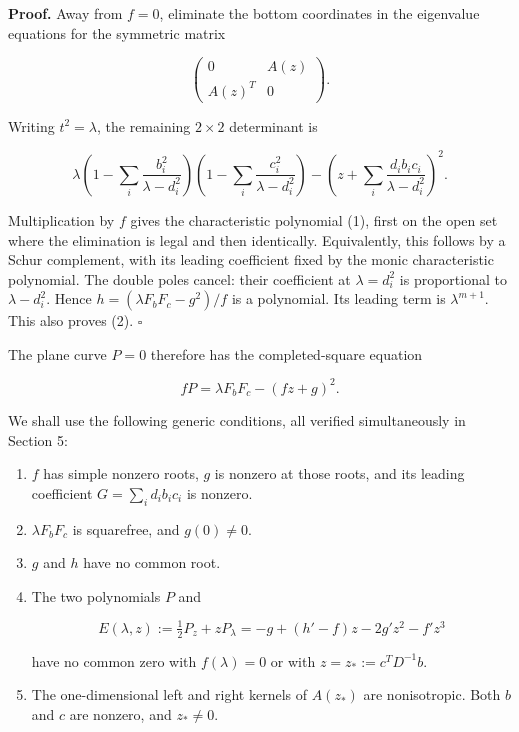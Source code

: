 \documentclass[10pt,a4paper]{article}
\begin{document}
\textbf{Proof.} Away from \(f=0\), eliminate the bottom coordinates in
the eigenvalue equations for the symmetric matrix

\nopagebreak[4]

\[\begin{pmatrix}0&A(z)\\A(z)^T&0\end{pmatrix}.\]

Writing \(t^2=\lambda\), the remaining \(2\times2\) determinant is

\nopagebreak[4]

\[\lambda\left(1-\sum_i\frac{b_i^2}{\lambda-d_i^2}\right)
\left(1-\sum_i\frac{c_i^2}{\lambda-d_i^2}\right)
-\left(z+\sum_i\frac{d_i b_i c_i}{\lambda-d_i^2}\right)^2.\]

Multiplication by \(f\) gives the characteristic polynomial (1), first
on the open set where the elimination is legal and then identically.
Equivalently, this follows by a Schur complement, with its leading
coefficient fixed by the monic characteristic polynomial. The double
poles cancel: their coefficient at \(\lambda=d_i^2\) is proportional to
\(\lambda-d_i^2\). Hence \(h=(\lambda F_bF_c-g^2)/f\) is a polynomial.
Its leading term is \(\lambda^{m+1}\). This also proves (2). \(\square\)

The plane curve \(P=0\) therefore has the completed-square equation

\nopagebreak[4]

\[fP=\lambda F_bF_c-(fz+g)^2.\tag{3}\]

We shall use the following generic conditions, all verified
simultaneously in Section 5:

\begin{enumerate}
\def\labelenumi{\arabic{enumi}.}
\item
  \(f\) has simple nonzero roots, \(g\) is nonzero at those roots, and
  its leading coefficient \(G=\sum_i d_i b_i c_i\) is nonzero.
\item
  \(\lambda F_bF_c\) is squarefree, and \(g(0)\ne0\).
\item
  \(g\) and \(h\) have no common root.
\item
  The two polynomials \(P\) and

  \nopagebreak[4]

  \[E(\lambda,z):=\tfrac12P_z+zP_\lambda
  =-g+(h'-f)z-2g'z^2-f'z^3\tag{4}\]

  have no common zero with \(f(\lambda)=0\) or with
  \(z=z_*:=c^TD^{-1}b\).
\item
  The one-dimensional left and right kernels of \(A(z_*)\) are
  nonisotropic. Both \(b\) and \(c\) are nonzero, and \(z_*\ne0\).
\end{enumerate}
\end{document}
